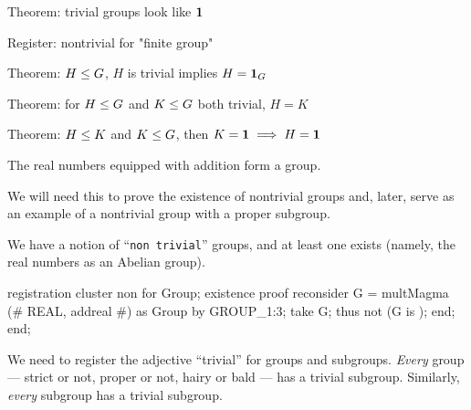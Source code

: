 \LA{}Theorem: trivial groups look like $\mathbf{1}$~{\nwtagstyle{}}\RA{}

\LA{}Register: nontrivial for "finite group"~{\nwtagstyle{}}\RA{}

\LA{}Theorem: $H\leq G$, $H$ is trivial implies $H=\mathbf{1}_{G}$~{\nwtagstyle{}}\RA{}

\LA{}Theorem: for $H\leq G$ and $K\leq G$ both trivial, $H=K$~{\nwtagstyle{}}\RA{}

\LA{}Theorem: $H\leq K$ and $K\leq G$, then $K=\mathbf{1}\implies H=\mathbf{1}$~{\nwtagstyle{}}\RA{}
\nwendcode{}\nwdocspar

\begin{proposition}
The real numbers equipped with addition form a group.
\end{proposition}

\begin{remark}
We will need this to prove the existence of nontrivial groups and, later,
serve as an example of a nontrivial group with a proper subgroup.
\end{remark}

\begin{registration}
We have a notion of ``\texttt{non trivial}'' groups, and at least one
exists (namely, the real numbers as an Abelian group).
\end{registration}

\nwenddocs{}\endmoddef\nwstartdeflinemarkup{}\nwenddeflinemarkup
registration
  cluster non  for Group;
  existence
  proof
    reconsider G = multMagma (# REAL, addreal #) as Group by GROUP_1:3;
    take G;
    thus not (G is );
  end;
end;
\eatline
{}\nwendcode{}\nwdocspar
\begin{registration}
We need to register the adjective ``trivial'' for groups and
subgroups. \emph{Every} group --- strict or not, proper or not, hairy
or bald --- has a trivial subgroup. Similarly, \emph{every} subgroup has
a trivial subgroup.
\end{registration}

